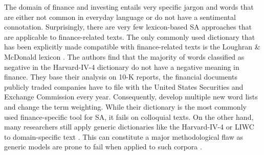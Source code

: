 The domain of finance and investing entails very specific jargon and words that are either not common in everyday language or do not have a sentimental connotation. Surprisingly, there are very few lexicon-based SA approaches that are applicable to finance-related texts. The only commonly used dictionary that has been explicitly made compatible with finance-related texts is the Loughran \& McDonald lexicon \cite{loughranMcD2011}. The authors find that the majority of words classified as negative in the Harvard-IV-4 dictionary  do not have a negative meaning in finance. They base their analysis on 10-K reports, the financial documents publicly traded companies have to file with the United States Securities and Exchange Commission every year. Consequently,  develop multiple new word lists and change the term weighting. While their dictionary is the most commonly used finance-specific tool for SA, it fails on colloquial texts. On the other hand, many researchers still apply generic dictionaries like the Harvard-IV-4 or LIWC to domain-specific text . This can constitute a major methodological flaw as generic models are prone to fail when applied to such corpora .


